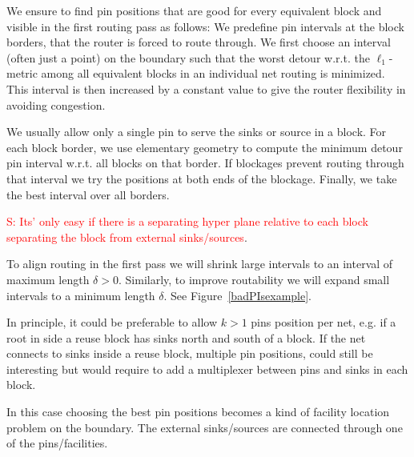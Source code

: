 \documentclass[a2paper]{bigsposter}
\begin{document}
\begin{blockrow}
\label{sec:pinintervals}

We ensure to find pin positions that are good for every equivalent block and visible in the first routing pass as follows:
We predefine pin intervals at the block borders, that the router is forced to route through.
We first choose an interval (often just a point) on the boundary such that the worst detour w.r.t. the  $\ell_1$-metric among all equivalent blocks in an individual net routing is minimized.
This interval is then increased  by a constant value to give the router flexibility in avoiding congestion.

We usually allow only a single pin to serve the sinks or source in a block.
For each block border, we use elementary geometry to compute the minimum detour pin
interval w.r.t. all blocks on that border.  If blockages prevent
routing through that interval we try the positions at both ends of the
blockage.  Finally, we take the best interval over all borders.

\textcolor{red}{S: Its' only easy if there is a separating hyper plane relative to each block  separating the block from external sinks/sources}.

To align routing in the first pass we will shrink large intervals to an interval of maximum  length $\delta>0$.
Similarly, to improve routability we will expand small intervals to a minimum length $\delta$.
See Figure~\ref{badPIsexample}.

In principle, it could be preferable to allow $k>1$ pins position  per net, e.g. if a root in side a reuse block
has sinks north and south of a block.
If the net connects to sinks inside a reuse block, multiple pin positions, could still be interesting but would
require to add a multiplexer between pins and sinks in each block.

In this case choosing the best pin positions becomes a kind of facility location problem on the boundary.
The external sinks/sources are connected through one of the pins/facilities.



\end{blockrow}
\end{document}
